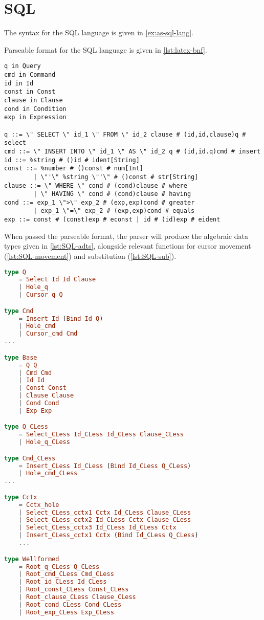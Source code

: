 \section{SQL}

The syntax for the SQL language is given in \cref{ex:as-sql-lang}.

Parseable format for the SQL language is given in \cref{lst:latex-bnf}.

\begin{lstlisting}[style=inline, caption={Parseable format of the SQL language syntax}, label={lst:SQL-bnf}]
q in Query
cmd in Command
id in Id
const in Const
clause in Clause
cond in Condition
exp in Expression

q ::= \" SELECT \" id_1 \" FROM \" id_2 clause # (id,id,clause)q # select
cmd ::= \" INSERT INTO \" id_1 \" AS \" id_2 q # (id,id.q)cmd # insert
id ::= %string # ()id # ident[String]
const ::= %number # ()const # num[Int] 
        | \"'\" %string \"'\" # ()const # str[String]
clause ::= \" WHERE \" cond # (cond)clause # where 
        | \" HAVING \" cond # (cond)clause # having
cond ::= exp_1 \">\" exp_2 # (exp,exp)cond # greater 
        | exp_1 \"=\" exp_2 # (exp,exp)cond # equals
exp ::= const # (const)exp # econst | id # (id)exp # eident
\end{lstlisting}

When passed the parseable format, the parser will produce the algebraic data types
given in \cref{lst:SQL-adts}, alongside relevant functions for cursor movement (\cref{lst:SQL-movement})
and substitution (\cref{lst:SQL-sub}).

\begin{minipage}{\textwidth}
    \begin{lstlisting}[style=inline, language=elm, caption={Generated ADT for the SQL language}, label={lst:SQL-adts}]
type Q
    = Select Id Id Clause
    | Hole_q
    | Cursor_q Q

type Cmd
    = Insert Id (Bind Id Q)
    | Hole_cmd
    | Cursor_cmd Cmd
...

type Base
    = Q Q
    | Cmd Cmd
    | Id Id
    | Const Const
    | Clause Clause
    | Cond Cond
    | Exp Exp

type Q_CLess
    = Select_CLess Id_CLess Id_CLess Clause_CLess
    | Hole_q_CLess

type Cmd_CLess
    = Insert_CLess Id_CLess (Bind Id_CLess Q_CLess)
    | Hole_cmd_CLess
...

type Cctx
    = Cctx_hole
    | Select_CLess_cctx1 Cctx Id_CLess Clause_CLess
    | Select_CLess_cctx2 Id_CLess Cctx Clause_CLess
    | Select_CLess_cctx3 Id_CLess Id_CLess Cctx
    | Insert_CLess_cctx1 Cctx (Bind Id_CLess Q_CLess)
    ...

type Wellformed
    = Root_q_CLess Q_CLess
    | Root_cmd_CLess Cmd_CLess
    | Root_id_CLess Id_CLess
    | Root_const_CLess Const_CLess
    | Root_clause_CLess Clause_CLess
    | Root_cond_CLess Cond_CLess
    | Root_exp_CLess Exp_CLess
\end{lstlisting}
\end{minipage}

